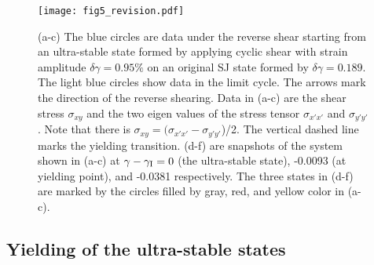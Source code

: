 \documentclass[twocolumn,showkeys,superscriptaddress,preprintnumbers,amsmath,amssymb,showpacs,prx,longbibliography]{revtex4-2}
\begin{document}
\begin{CJK*}{UTF8}{gbsn}


\begin{figure}[t]
    \centering
    \texttt{[image: fig5\_revision.pdf]}
    \caption{(a-c) The 
    blue circles are data under the reverse shear starting from an ultra-stable state formed by applying cyclic shear with strain amplitude 
    $\delta\gamma=0.95\%$
    on an original SJ state formed by 
    $\delta\gamma=0.189$. 
    The light blue circles show data in the 
    limit cycle. The arrows mark the direction of the reverse shearing. 
    Data in (a-c) are the shear stress $\sigma_{xy}$ and the two eigen values of the stress tensor $\sigma_{x'x'}$ and $\sigma_{y'y'}$. Note that there is $\sigma_{xy} = (\sigma_{x'x'}-\sigma_{y'y'}$)/2.
    The vertical dashed line marks the yielding transition.    (d-f) are snapshots of the system shown in (a-c) at $\gamma-\gamma_{\rm I}=0$ (the ultra-stable state),
    -0.0093 (at yielding point), and -0.0381
    respectively.
    The three states in (d-f) are marked by the circles filled by gray, red, and yellow color in (a-c).
    \label{fig:yield}}
\end{figure}


\subsection{Yielding of the ultra-stable states}




\end{CJK*}
\end{document}
